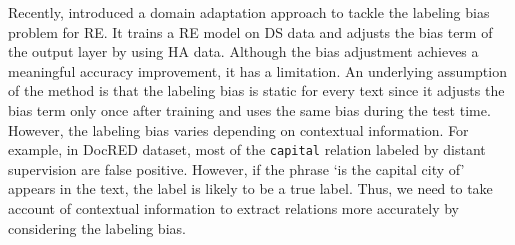 \documentclass[11pt]{article}
\newcommand{\relationt}[1]{\texttt{#1}}
\begin{document}
Recently,  introduced a domain adaptation approach to tackle the labeling bias problem for RE.
It trains a RE model on DS data and adjusts the bias term of the output layer by using HA data.
Although the bias adjustment achieves a meaningful accuracy improvement, it has a limitation.
An underlying assumption of the method is that the labeling bias is static for every text since it adjusts the bias term only once after training and uses the same bias during the test time.
However, the labeling bias varies depending on contextual information.
For example, in DocRED dataset, most of the \relationt{capital} relation labeled by distant supervision are false positive.
However, if the phrase `is the capital city of' appears in the text, the label is likely to be a true label.
Thus, we need to take account of contextual information to extract relations more accurately by considering the labeling bias.
\end{document}
